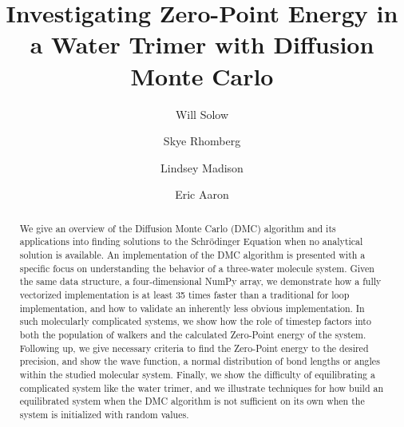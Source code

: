 \documentclass[journal=jacsat,manuscript=article]{achemso}
\author{Will Solow}
\author{Skye Rhomberg}
\author{Lindsey Madison}
\author{Eric Aaron}
\affiliation[Colby College]
{Department of Computer Science, Colby College, Waterville, ME}
\title[An \textsf{achemso} demo]
  {Investigating Zero-Point Energy in a Water Trimer with Diffusion Monte Carlo}
\begin{document}
%
%
%
%
%

\begin{abstract}
We give an overview of the Diffusion Monte Carlo (DMC) algorithm and its applications into finding solutions to the Schr\"odinger Equation when no analytical solution is available. An implementation of the DMC algorithm is presented with a specific focus on understanding the behavior of a three-water molecule system. Given the same data structure, a four-dimensional NumPy array, we demonstrate how a fully vectorized implementation is at least 35 times faster than a traditional for loop implementation, and how to validate an inherently less obvious implementation. In such molecularly complicated systems, we show how the role of timestep factors into both the population of walkers and the calculated Zero-Point energy of the system. Following up, we give necessary criteria to find the Zero-Point energy to the desired precision, and show the wave function, a normal distribution of bond lengths or angles within the studied molecular system. Finally, we show the difficulty of equilibrating a complicated system like the water trimer, and we illustrate techniques for how build an equilibrated system when the DMC algorithm is not sufficient on its own when the system is initialized with random values.
\end{abstract}
\end{document}
